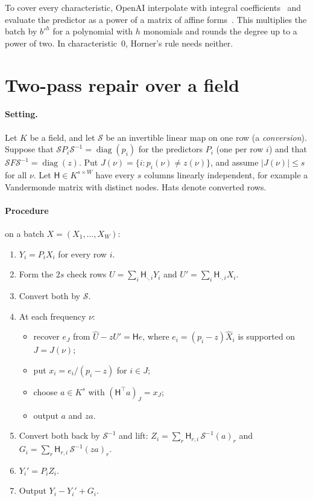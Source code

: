\documentclass[acmsmall,nonacm,screen]{acmart}
\begin{document}
To cover every characteristic, OpenAI interpolate with integral coefficients~\cite[Lemma~4.2]{oai2026} and evaluate the predictor as a power of a matrix of affine forms~\cite[Lemma~4.3]{oai2026}. This multiplies the batch by $b'^{h}$ for a polynomial with $h$ monomials and rounds the degree up to a power of two. In characteristic~$0$, Horner's rule needs neither.

\section{Two-pass repair over a field}\label{sec:repair}

\paragraph{Setting.} Let $K$ be a field, and let $\mathcal S$ be an invertible linear map on one row (a \emph{conversion}). Suppose that $\mathcal SP_i\mathcal S^{-1}=\operatorname{diag}(p_i)$ for the predictors $P_i$ (one per row $i$) and that $\mathcal SF\mathcal S^{-1}=\operatorname{diag}(z)$. Put $J(\nu)=\{i:p_i(\nu)\ne z(\nu)\}$, and assume $|J(\nu)|\le s$ for all $\nu$. Let $\mathsf H\in K^{s\times W}$ have every $s$ columns linearly independent, for example a Vandermonde matrix with distinct nodes. Hats denote converted rows.

\paragraph{Procedure} on a batch $X=(X_1,\dots,X_W)$:
\begin{enumerate}
\item $Y_i=P_iX_i$ for every row $i$.
\item Form the $2s$ check rows $U=\sum_i\mathsf H_{\cdot,i}Y_i$ and $U'=\sum_i\mathsf H_{\cdot,i}X_i$.
\item Convert both by $\mathcal S$.
\item At each frequency $\nu$:
  \begin{itemize}
  \item recover $e_{J}$ from $\hat U-z\hat U'=\mathsf He$, where $e_i=(p_i-z)\hat X_i$ is supported on $J=J(\nu)$;
  \item put $x_i=e_i/(p_i-z)$ for $i\in J$;
  \item choose $a\in K^s$ with $(\mathsf H^{\top}a)_J=x_J$;
  \item output $a$ and $za$.
  \end{itemize}
\item Convert both back by $\mathcal S^{-1}$ and lift: $Z_i=\sum_r\mathsf H_{r,i}\,\mathcal S^{-1}(a)_r$ and $G_i=\sum_r\mathsf H_{r,i}\,\mathcal S^{-1}(za)_r$.
\item $Y_i'=P_iZ_i$.
\item Output $Y_i-Y_i'+G_i$.
\end{enumerate}
\end{document}
